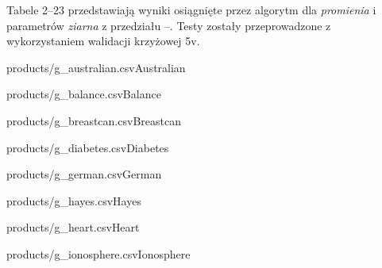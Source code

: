 \documentclass[]{article}
\begin{document}
Tabele 2--23 przedstawiają wyniki osiągnięte przez algorytm dla \emph{promienia}  i parametrów \emph{ziarna} z przedziału --. Testy zostały przeprowadzone z wykorzystaniem walidacji krzyżowej \oldstylenums5v.

\begin{table}[htb]
    \parbox{.45\linewidth}{
	    \begin{rideg}{products/g_australian.csv}{Australian}\end{rideg}
	}
	\hfill
    \parbox{.45\linewidth}{
	    \begin{rideg}{products/g_balance.csv}{Balance}\end{rideg}
	}
\end{table}

\begin{table}[!ht]
    \parbox{.45\linewidth}{
	    \begin{rideg}{products/g_breastcan.csv}{Breastcan}\end{rideg}
	}
	\hfill
    \parbox{.45\linewidth}{
	    \begin{rideg}{products/g_diabetes.csv}{Diabetes}\end{rideg}
	}
\end{table}


\begin{table}[!ht]
    \parbox{.45\linewidth}{
	    \begin{rideg}{products/g_german.csv}{German}\end{rideg}
	}
	\hfill
    \parbox{.45\linewidth}{
	    \begin{rideg}{products/g_hayes.csv}{Hayes}\end{rideg}
	}
\end{table}

\begin{table}[!ht]
    \parbox{.45\linewidth}{
	    \begin{rideg}{products/g_heart.csv}{Heart}\end{rideg}
	}
	\hfill
    \parbox{.45\linewidth}{
	    \begin{rideg}{products/g_ionosphere.csv}{Ionosphere}\end{rideg}
	}
\end{table}
\end{document}
